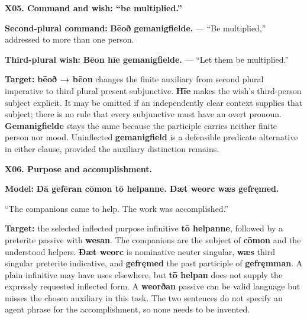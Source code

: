 \par\begin{minipage}{\linewidth}\raggedright
\textbf{X05. Command and wish: “be multiplied.”}

\textbf{Second-plural command:} \textbf{Bēoð gemanigfielde.} — “Be multiplied,” addressed to more than one person.

\textbf{Third-plural wish:} \textbf{Bēon hīe gemanigfielde.} — “Let them be multiplied.”

\textbf{Target:} \textbf{bēoð → bēon} changes the finite auxiliary from second plural imperative to third plural present subjunctive. \textbf{Hīe} makes the wish’s third-person subject explicit. It may be omitted if an independently clear context supplies that subject; there is no rule that every subjunctive must have an overt pronoun. \textbf{Gemanigfielde} stays the same because the participle carries neither finite person nor mood. Uninflected \textbf{gemanigfield} is a defensible predicate alternative in either clause, provided the auxiliary distinction remains.

\end{minipage}\par\addvspace{4pt}

\par\begin{minipage}{\linewidth}\raggedright
\textbf{X06. Purpose and accomplishment.}

\textbf{Model:} \textbf{Ðā gefēran cōmon tō helpanne. Ðæt weorc wæs gefręmed.}

“The companions came to help. The work was accomplished.”

\textbf{Target:} the selected inflected purpose infinitive \textbf{tō helpanne}, followed by a preterite passive with \textbf{wesan}. The companions are the subject of \textbf{cōmon} and the understood helpers. \textbf{Ðæt weorc} is nominative neuter singular, \textbf{wæs} third singular preterite indicative, and \textbf{gefręmed} the past participle of \textbf{gefręmman}. A plain infinitive may have uses elsewhere, but \textbf{tō helpan} does not supply the expressly requested inflected form. A \textbf{weorðan} passive can be valid language but misses the chosen auxiliary in this task. The two sentences do not specify an agent phrase for the accomplishment, so none needs to be invented.

\end{minipage}\par\addvspace{4pt}

